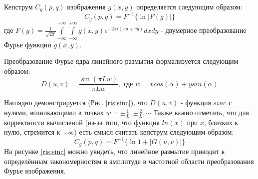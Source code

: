 Кепструм $C_{g}(p, q)$ изображения $g(x,y)$ определяется следующим образом:
\begin{equation}C_{g}(p, q)=F^{-1}\{\ln |F(g)|\}
\label{cepstrum_def}
\end{equation}
где  $F(g) = \frac{1}{\sqrt{2 \pi}} \int\limits_{-\infty}^{+\infty} \int\limits_{-\infty}^{+\infty} g(x, y) e^{-2 \pi i (x u+v y)} d x d y$  - двумерное преобразование Фурье функции $g(x,y)$.



 Преобразование Фурье ядра линейного размытия формализуется следующим образом:
\begin{equation}
D(u, v)=\frac{\sin (\pi L w)}{\pi L w}, \text{ где } w = x cos(\alpha) + y sin(\alpha)
\label{motion_blur_fourier}
\end{equation}
\par

Наглядно демонстрируется (Рис. \ref{ris:sinc}), что $D(u,v)$ - функция $sinc$ с нулями, возникающими в точках $w=\pm \frac{1}{L}, \pm \frac{2}{L}, \cdots$
Также важно отметить, что для корректности вычислений (из-за того, что функция $ln(x)$ 
при $x$, близких к нулю, стремится к~$-\infinity$) есть смысл считать кепструм следующим образом:
$$C_{g}(p, q)=F^{-1}\{\ln 1+ |G(u, v)|\}$$
На рисунке \ref{ris:sinc} можно увидеть, что линейное размытие приводит к определённым закономерностям в амплитуде в частотной области преобразования Фурье изображения.
\par

